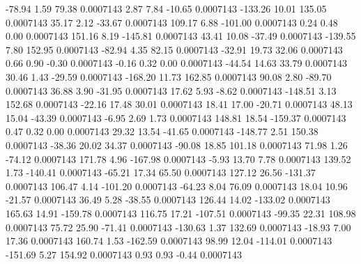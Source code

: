       -78.94        1.59       79.38     0.0007143
        2.87        7.84      -10.65     0.0007143
     -133.26       10.01      135.05     0.0007143
       35.17        2.12      -33.67     0.0007143
      109.17        6.88     -101.00     0.0007143
        0.24        0.48        0.00     0.0007143
      151.16        8.19     -145.81     0.0007143
       43.41       10.08      -37.49     0.0007143
     -139.55        7.80      152.95     0.0007143
      -82.94        4.35       82.15     0.0007143
      -32.91       19.73       32.06     0.0007143
        0.66        0.90       -0.30     0.0007143
       -0.16        0.32        0.00     0.0007143
      -44.54       14.63       33.79     0.0007143
       30.46        1.43      -29.59     0.0007143
     -168.20       11.73      162.85     0.0007143
       90.08        2.80      -89.70     0.0007143
       36.88        3.90      -31.95     0.0007143
       17.62        5.93       -8.62     0.0007143
     -148.51        3.13      152.68     0.0007143
      -22.16       17.48       30.01     0.0007143
       18.41       17.00      -20.71     0.0007143
       48.13       15.04      -43.39     0.0007143
       -6.95        2.69        1.73     0.0007143
      148.81       18.54     -159.37     0.0007143
        0.47        0.32        0.00     0.0007143
       29.32       13.54      -41.65     0.0007143
     -148.77        2.51      150.38     0.0007143
      -38.36       20.02       34.37     0.0007143
      -90.08       18.85      101.18     0.0007143
       71.98        1.26      -74.12     0.0007143
      171.78        4.96     -167.98     0.0007143
       -5.93       13.70        7.78     0.0007143
      139.52        1.73     -140.41     0.0007143
      -65.21       17.34       65.50     0.0007143
      127.12       26.56     -131.37     0.0007143
      106.47        4.14     -101.20     0.0007143
      -64.23        8.04       76.09     0.0007143
       18.04       10.96      -21.57     0.0007143
       36.49        5.28      -38.55     0.0007143
      126.44       14.02     -133.02     0.0007143
      165.63       14.91     -159.78     0.0007143
      116.75       17.21     -107.51     0.0007143
      -99.35       22.31      108.98     0.0007143
       75.72       25.90      -71.41     0.0007143
     -130.63        1.37      132.69     0.0007143
      -18.93        7.00       17.36     0.0007143
      160.74        1.53     -162.59     0.0007143
       98.99       12.04     -114.01     0.0007143
     -151.69        5.27      154.92     0.0007143
        0.93        0.93       -0.44     0.0007143
